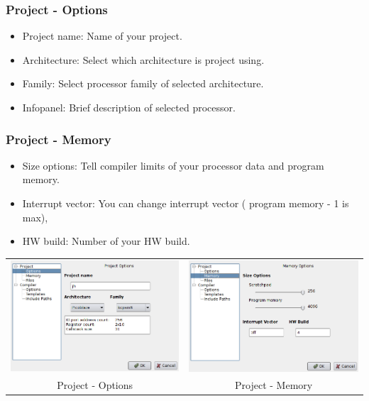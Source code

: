     \subsubsection{Project - Options}
        \begin{itemize}
            \item Project name: Name of your project.
            \item Architecture: Select which architecture is project using.
            \item Family: Select processor family of selected architecture.
            \item Infopanel: Brief description of selected processor.
        \end{itemize}
    
        \subsubsection{Project - Memory}
            \begin{itemize}
                \item Size options: Tell compiler limits of your processor data and program memory.
                \item Interrupt vector: You can change interrupt vector ( program memory - 1 is max),
                \item HW build: Number of your HW build.
            \end{itemize}
    
        \begin{table}[h!]
            \begin{tabular}{cc}
                \includegraphics[width=.5\textwidth]{img/NewImg/config2.png}
                    &
                \includegraphics[width=.5\textwidth]{img/NewImg/config1.png}
                    \\
                Project - Options & Project - Memory
            \end{tabular}
        \end{table}

